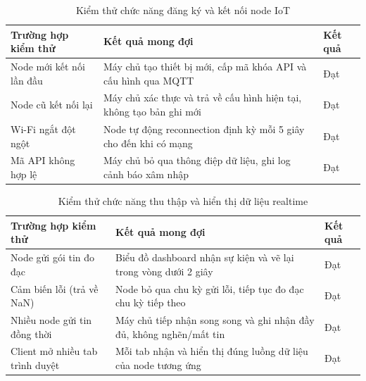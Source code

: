 \begin{table}[H]
  \centering
  \caption{Kiểm thử chức năng đăng ký và kết nối node IoT}
  \label{tab:test_register}
  \begin{tabularx}{\textwidth}{p{4cm} X p{1.5cm}}
    \toprule
    \textbf{Trường hợp kiểm thử} & \textbf{Kết quả mong đợi}
      & \textbf{Kết quả} \\
    \midrule
    Node mới kết nối lần đầu
      & Máy chủ tạo thiết bị mới, cấp mã khóa API và cấu hình qua MQTT
      & Đạt \\
    Node cũ kết nối lại
      & Máy chủ xác thực và trả về cấu hình hiện tại, không tạo bản ghi mới
      & Đạt \\
    Wi-Fi ngắt đột ngột
      & Node tự động reconnection định kỳ mỗi 5 giây cho đến khi có mạng
      & Đạt \\
    Mã API không hợp lệ
      & Máy chủ bỏ qua thông điệp dữ liệu, ghi log cảnh báo xâm nhập
      & Đạt \\
    \bottomrule
  \end{tabularx}
\end{table}

\begin{table}[H]
  \centering
  \caption{Kiểm thử chức năng thu thập và hiển thị dữ liệu realtime}
  \label{tab:test_realtime}
  \begin{tabularx}{\textwidth}{p{4cm} X p{1.5cm}}
    \toprule
    \textbf{Trường hợp kiểm thử} & \textbf{Kết quả mong đợi}
      & \textbf{Kết quả} \\
    \midrule
    Node gửi gói tin đo đạc
      & Biểu đồ dashboard nhận sự kiện và vẽ lại trong vòng dưới 2 giây
      & Đạt \\
    Cảm biến lỗi (trả về NaN)
      & Node bỏ qua chu kỳ gửi lỗi, tiếp tục đo đạc chu kỳ tiếp theo
      & Đạt \\
    Nhiều node gửi tin đồng thời
      & Máy chủ tiếp nhận song song và ghi nhận đầy đủ, không nghẽn/mất tin
      & Đạt \\
    Client mở nhiều tab trình duyệt
      & Mỗi tab nhận và hiển thị đúng luồng dữ liệu của node tương ứng
      & Đạt \\
    \bottomrule
  \end{tabularx}
\end{table}

